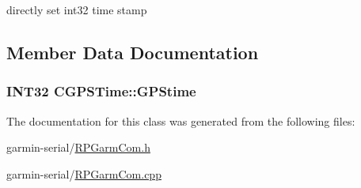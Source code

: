 directly set int32 time stamp 



\subsection{Member Data Documentation}
\hypertarget{classCGPSTime_af6905e087847eda9c239be33e3c6e13a}{
\subsubsection[{GPStime}]{\setlength{\rightskip}{0pt plus 5cm}INT32 {\bf CGPSTime::GPStime}}}
\label{classCGPSTime_af6905e087847eda9c239be33e3c6e13a}


The documentation for this class was generated from the following files:\begin{DoxyCompactItemize}
\item 
garmin-\/serial/\hyperlink{RPGarmCom_8h}{RPGarmCom.h}\item 
garmin-\/serial/\hyperlink{RPGarmCom_8cpp}{RPGarmCom.cpp}\end{DoxyCompactItemize}
